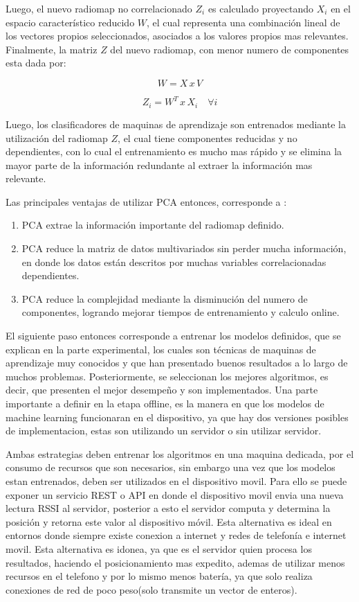 Luego, el nuevo radiomap no correlacionado $Z_{i}$ es calculado proyectando $X_{i}$ en el espacio característico reducido $W$, el cual representa una combinación lineal de los vectores propios seleccionados, asociados a los valores propios mas relevantes. Finalmente, la matriz $Z$ del nuevo radiomap, con menor numero de componentes esta dada por:

$$ W = X \, x \, V$$

$$ Z_{i} = W^{T} \, x \, X_{i} \quad \forall i$$

Luego, los clasificadores de maquinas de aprendizaje son entrenados mediante la utilización del radiomap $Z$, el cual tiene componentes reducidas y no dependientes, con lo cual el entrenamiento es mucho mas rápido y se elimina la mayor parte de la información redundante al extraer la información mas relevante.

Las principales ventajas de utilizar PCA entonces, corresponde a \citep{7743586}:

\begin{enumerate}
\item PCA extrae la información importante del radiomap definido.

\item PCA reduce la matriz de datos multivariados sin perder mucha información, en donde los datos están descritos por muchas variables correlacionadas dependientes.

\item PCA reduce la complejidad mediante la disminución del numero de componentes, logrando mejorar tiempos de entrenamiento y calculo online.
\end{enumerate}


El siguiente paso entonces corresponde a entrenar los modelos definidos, que se explican en la parte experimental, los cuales son técnicas de maquinas de aprendizaje muy conocidos y que han presentado buenos resultados a lo largo de muchos problemas. Posteriormente, se seleccionan los mejores algoritmos, es decir, que presenten el mejor desempeño y son implementados. Una parte importante a definir en la etapa offline, es la manera en que los modelos de machine learning funcionaran en el dispositivo, ya que hay dos versiones posibles de implementacion, estas son utilizando un servidor o sin utilizar servidor. 

Ambas estrategias deben entrenar los algoritmos en una maquina dedicada, por el consumo de recursos que son necesarios, sin embargo una vez que los modelos estan entrenados, deben ser utilizados en el dispositivo movil. Para ello se puede exponer un servicio REST o API en donde el dispositivo movil envia una nueva lectura RSSI al servidor, posterior a esto el servidor computa y determina la posición y retorna este valor al dispositivo móvil. Esta alternativa es ideal en entornos donde siempre existe conexion a internet y redes de telefonía e internet movil. Esta alternativa es idonea, ya que es el servidor quien procesa los resultados, haciendo el posicionamiento mas expedito, ademas de utilizar menos recursos en el telefono y por lo mismo menos batería, ya que solo realiza conexiones de red de poco peso(solo transmite un vector de enteros).

